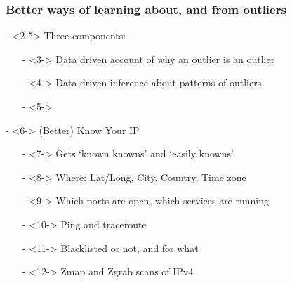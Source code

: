 \documentclass[compress]{beamer}
\begin{document}
\begin{frame}
\frametitle{Better ways of learning about, and from outliers}
 \begin{large_enum}
  \item[-]<2-5> Three components:
    \begin{itemize} 
      \item[-]<3-> Data driven account of why an outlier is an outlier
      \item[-]<4-> Data driven inference about patterns of outliers 
      \item[-]<5-> \color{red}{Diving Deeply More Quickly}
    \end{itemize}
  \item[-]<6-> (Better) Know Your IP
    \begin{itemize}
      \item[-]<7-> Gets `known knowns' and `easily knowns'
      \item[-]<8-> Where: Lat/Long, City, Country, Time zone
      \item[-]<9-> Which ports are open, which services are running
      \item[-]<10-> Ping and traceroute
      \item[-]<11-> Blacklisted or not, and for what
      \item[-]<12-> Zmap and Zgrab scans of IPv4
    \end{itemize}
\end{large_enum}
\end{frame}
\end{document}
